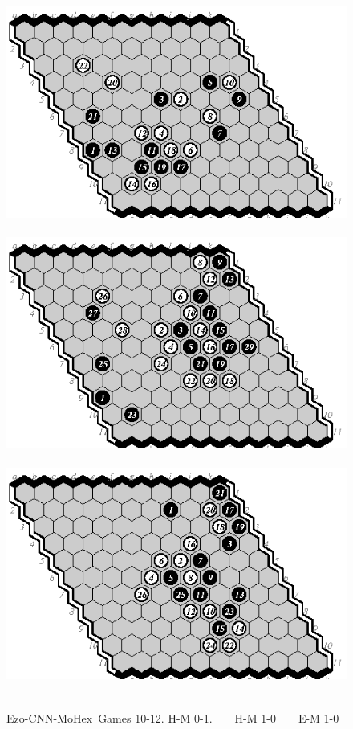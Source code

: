 \documentclass{icga}
\def\Ec{\mbox{\sc Ezo-CNN}}
\def\Mx{\mbox{\sc MoHex}}
\begin{document}
\begin{figure}[hbp]
\includegraphics[scale=1]{pix/11.me10.eps}\hspace*{-1.2cm}\
\includegraphics[scale=1]{pix/11.me11.eps}\hspace*{-1.2cm}\
\includegraphics[scale=1]{pix/11.em12.eps}\hspace*{-1.2cm}\
\caption{\Ec-\Mx\ Games 10-12. H-M 0-1. ~ ~ H-M 1-0 ~ ~ E-M 1-0}
\end{figure}
\end{document}
